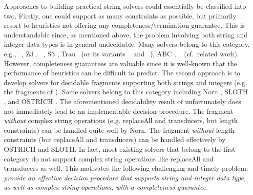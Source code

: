 Approaches to building practical string solvers could essentially be classified
into two. Firstly, one could support as many constraints as possible, but 
primarily resort to heuristics not
offering any completeness/termination guarantee. This is understandable since, as
mentioned above, the problem involving both string and integer data types is in 
general undecidable. Many solvers
belong to this category, e.g., 
{\cvc}~\cite{cvc4}, Z3 \cite{BTV09,Z3}, {\zthree}~\cite{Z3-str3}, S3 \cite{S3,TCJ16},
Trau~\cite{Abdulla17} (or its variants {\trauplus}~\cite{AbdullaA+19} and {\zthreetrau}~\cite{Z3-trau}), ABC \cite{ABC}, \slent~\cite{WC+18} (cf.\ related work).
%
%
However, completeness guarantees are valuable since it is well-known that the 
performance of heuristics can be difficult to predict.
The second approach is to develop solvers for decidable fragments
supporting both strings and integers (e.g. the fragments of
\cite{Vijay-length,BFL13,Abdulla14,AbdullaA+19,LB16,CCH+18,CHL+19,HJLRV18}). 
Some solvers belong to this category including Norn \cite{Abdulla14}, SLOTH
\cite{HJLRV18}, and OSTRICH \cite{CHL+19}. 
The aforementioned decidability result of \cite{LB16} unfortunately does not
immediately lead to an implementable decision procedure.
The fragment \emph{without} complex string operations (e.g. replaceAll and
transducers, but length constraints) can be handled quite well by Norn. The fragment \emph{without} length
constraints (but replaceAll and transducers)
can be handled effectively by OSTRICH and SLOTH. 
In fact, most existing solvers that belong to the first category do not support
complex string operations like replaceAll and transducers as well.
This motivates the following challenging and timely problem: \emph{provide an
effective decision procedure that supports string and integer data type, as well
as complex string operations, with a completeness guarantee}.



